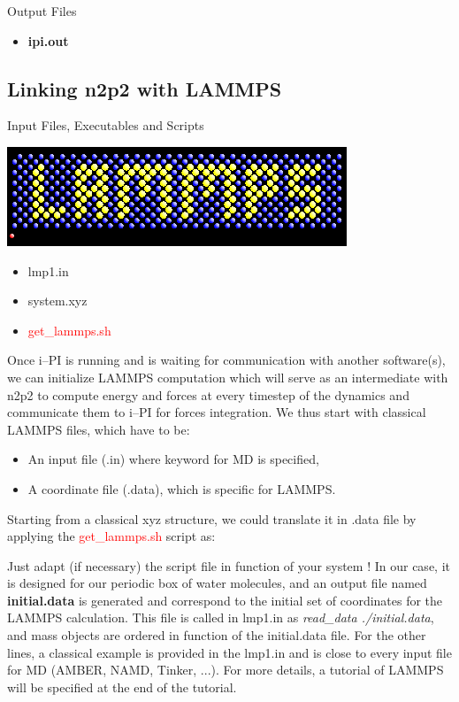 \documentclass[12pt]{article}
\begin{document}
\begin{mybox3}{Output Files}
\begin{itemize}
    \item \textbf{ipi.out}
\end{itemize}
\end{mybox3}
%
\subsection{Linking n2p2 with LAMMPS}
\begin{mybox2}{{Input Files, Executables and Scripts}}
\begin{minipage}[c]{0.5\linewidth}
\includegraphics[scale=0.35]{LAMMPS.png}
\end{minipage}
\begin{minipage}[c]{0.5\linewidth}
\begin{itemize}
    \item lmp1.in
    \item system.xyz
    \item \textcolor{red}{get\_lammps.sh}
\end{itemize}
\end{minipage}
\end{mybox2}
Once i--PI is running and is waiting for communication with another software(s), we can initialize LAMMPS computation which will serve as an intermediate with n2p2 to compute energy and forces at every timestep of the dynamics and communicate them to i--PI for forces integration. We thus start with classical LAMMPS files, which have to be:
\begin{itemize}
    \item An input file (.in) where keyword for MD is specified,
    \item A coordinate file (.data), which is specific for LAMMPS.
\end{itemize}
Starting from a classical xyz structure, we could translate it in .data file by applying the \textcolor{red}{get\_lammps.sh} script as:
\begin{center}
\end{center}
Just adapt (if necessary) the script file in function of your system ! In our case, it is designed for our periodic box of water molecules, and an output file named \textbf{initial.data} is generated and correspond to the initial set of coordinates for the LAMMPS calculation. This file is called in lmp1.in as \textit{read\_data ./initial.data}, and mass objects are ordered in function of the initial.data file. For the other lines, a classical example is provided in the lmp1.in and is close to every input file for MD (AMBER, NAMD, Tinker, ...). For more details, a tutorial of LAMMPS will be specified at the end of the tutorial. \\
\end{document}
